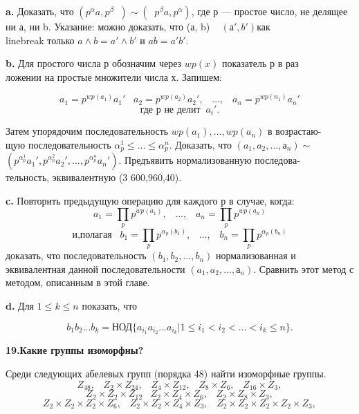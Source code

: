 \documentclass{../template/mai_book}
\begin{document}
{\bf a.} Доказать, что $ (p^{\alpha}a,p^{\beta}\;\;)\sim(\;\;p^{\beta}a,p^{\alpha}) $, где р — простое число, не 
делящее ни а, ни b. Указание: можно доказать, что (а, b) ~ $(а', b')$как\\linebreak 
только $a\wedge b = a'\wedge b'$ и $ab = a'b'$. 

\medskip


{\bf b.} Для простого числа р обозначим через $ wp(x)$ показатель р в 
раз\\ложении на простые множители числа х. Запишем: 


$$a_1=p^{ wp(a_1)}a_1'\;\;\;a_2=p^{ wp(a_2)}a_2',\;\;\;...,\;\;\;a_n=p^{ wp(n_1)}a_n'$$ 
$$\text{где р не делит}\;\;a_i'. $$



Затем упорядочим последовательность $ wp(a_1),..., wp(a_n)$ в 
возрастаю-\\
щую последовательность $ \alpha^1_p\leqslant...\leqslant\alpha^n_p $. Доказать, что $(a_1, a_2,..., а_n)\sim$\\
$(p^{\alpha_p^1}a_1',p^{\alpha_p^2}a_2',...,p^{\alpha_p^n}a_n') $. Предъявить нормализованную 
последова-\\тельность, эквивалентную (3 600,960,40). 

\medskip

{\bf c.} Повторить предыдущую операцию для каждого р в случае, когда: 
$$\displaystyle a_1=\prod_pp^{ wp(a_1)},\;\;\;...,\;\;\; a_n=\prod_p p^{ wp(a_n)}$$
$$\displaystyle \text{и,полагая}\;\;\;b_1=\prod_pp^{\alpha_p(b_1)},\;\;\;...,\;\;\; b_n=\prod_p p^{\alpha_p(b_n)} $$ 
доказать, что последовательность $(b_1, b_2,..., b_n)$ нормализованная и 
эквивалентная данной последовательности $(a_1, a_2,..., а_n)$. Сравнить 
этот метод с методом, описанным в этой главе. 

\medskip

{\bf d.} Для $1\leqslant k\leqslant n$ показать, что 

$$ b_1b_2... b_k = \text{НОД}\{a_{i_1}a_{i_2}... a_{i_k}|1\leqslant i_1<i_2<... <i_k\leqslant n\}. $$

\pagebreak

{\noindent\bf19.Какие группы изоморфны?} 


Среди следующих абелевых групп (порядка 48) найти изоморфные 
группы. 
$$Z_{48},\;\;\;Z_2 \times Z_{24},\;\;\;Z_4 \times Z_{12},\;\;\;Z_8 \times Z_6,\;\;\;Z_{16} \times Z_3, $$
$$Z_2 \times Z_2 \times Z_{12}\;\;\; Z_2 \times Z_4 \times Z_6,\;\;\;Z_2 \times Z_8 \times Z_3, $$
$$Z_2 \times Z_2 \times Z_2 \times Z_6,\;\;\;Z_2 \times Z_2 \times Z_4 \times Z_3,\;\;\; Z_2 \times Z_2 \times Z_2 \times Z_2 \times Z_3, $$
\end{document}
